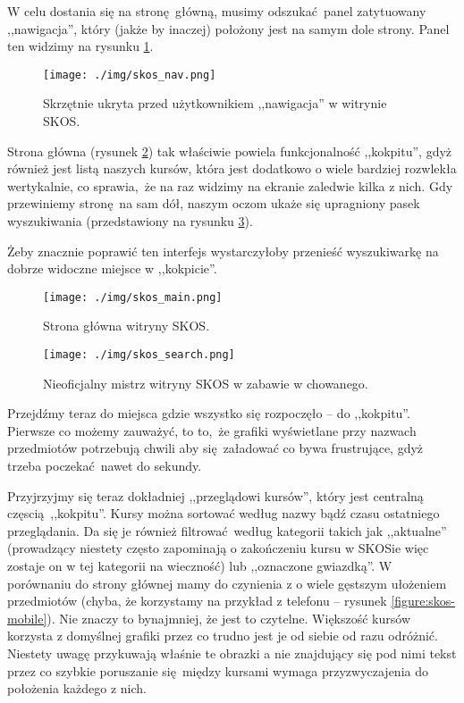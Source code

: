 \documentclass[12pt, a4paper, oneside]{report}
\begin{document}
W celu dostania się na stronę główną, musimy odszukać panel zatytuowany 
,,nawigacja'', który (jakże by inaczej) położony jest na samym dole strony.
Panel ten widzimy na rysunku \ref{figure:skos-nav}.

\begin{figure}[H]
    \centering
    \texttt{[image: ./img/skos\_nav.png]}
    \caption{Skrzętnie ukryta przed użytkownikiem 
             ,,nawigacja'' w witrynie SKOS.}
    \label{figure:skos-nav}
\end{figure}

Strona główna (rysunek \ref{figure:skos-main}) tak właściwie powiela 
funkcjonalność ,,kokpitu'', gdyż również jest listą naszych kursów, która jest 
dodatkowo o wiele bardziej rozwlekła wertykalnie, co sprawia, że na raz widzimy 
na ekranie zaledwie kilka z nich. Gdy przewiniemy stronę na sam dół, naszym
oczom ukaże się upragniony pasek wyszukiwania (przedstawiony na rysunku \ref{figure:skos-search}).

Żeby znacznie poprawić ten interfejs wystarczyłoby przenieść wyszukiwarkę na 
dobrze widoczne miejsce w ,,kokpicie''.

\begin{figure}[H]
    \centering
    \texttt{[image: ./img/skos\_main.png]}
    \caption{Strona główna witryny SKOS.}
    \label{figure:skos-main}
\end{figure}


\begin{figure}[H]
    \centering
    \texttt{[image: ./img/skos\_search.png]}
    \caption{Nieoficjalny mistrz witryny SKOS w zabawie w chowanego.}
    \label{figure:skos-search}
\end{figure}


Przejdźmy teraz do miejsca gdzie wszystko się rozpoczęło -- do ,,kokpitu''.
Pierwsze co możemy zauważyć, to to, że grafiki wyświetlane przy nazwach
przedmiotów potrzebują chwili aby się załadować co bywa frustrujące, gdyż
trzeba poczekać nawet do sekundy.

Przyjrzyjmy się teraz dokładniej ,,przeglądowi kursów'', który jest centralną
częscią ,,kokpitu''. Kursy można sortować według nazwy bądź czasu ostatniego
przeglądania. Da się je również filtrować według kategorii takich jak 
,,aktualne'' (prowadzący niestety często zapominają o zakończeniu kursu w
SKOSie więc zostaje on w tej kategorii na wieczność) lub ,,oznaczone gwiazdką''.
W porównaniu do strony głównej mamy do czynienia z o wiele gęstszym ułożeniem
przedmiotów (chyba, że korzystamy na przykład z telefonu -- 
rysunek \ref{figure:skos-mobile}). Nie znaczy to bynajmniej, że jest to
czytelne. Większość kursów korzysta z domyślnej grafiki przez co trudno jest
je od siebie od razu odróżnić. Niestety uwagę przykuwają właśnie te obrazki a
nie znajdujący się pod nimi tekst przez co szybkie poruszanie się między kursami
wymaga przyzwyczajenia do położenia każdego z nich.
\end{document}
